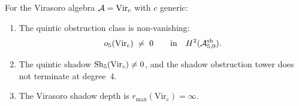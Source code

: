 \begin{theorem}
\label{thm:thqg-VI-quintic-forced}
For the Virasoro algebra $\mathcal{A} = \mathrm{Vir}_c$ with $c$ generic:
\begin{enumerate}[label=\textup{(\roman*)}]
\item The quintic obstruction class is non-vanishing:
\begin{equation}\label{eq:thqg-VI-quintic-nonvanishing}
o_5(\mathrm{Vir}_c) \;\neq\; 0
\qquad\text{in}\quad
H^2(\mathcal{A}^{\mathrm{sh}}_{5,0}).
\end{equation}
\item The quintic shadow $\operatorname{Sh}_5(\mathrm{Vir}_c) \neq 0$, and
 the shadow obstruction tower does not terminate at degree~$4$.
\item The Virasoro shadow depth is $r_{\max}(\mathrm{Vir}_c) = \infty$.
\end{enumerate}
\end{theorem}

